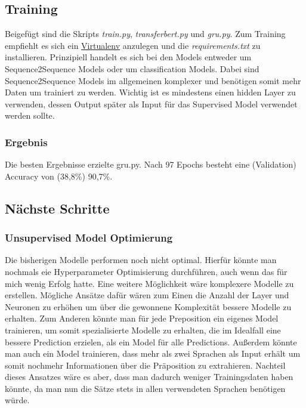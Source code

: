 \documentclass[10pt,a4paper]{article}
\begin{document}
\subsection{Training}
\begin{flushleft}
Beigefügt sind die Skripts \emph{train.py}, \emph{transferbert.py} und \emph{gru.py}. Zum Training empfiehlt es sich ein \href{https://docs.python.org/3/tutorial/venv.html}{Virtualenv} anzulegen und die \emph{requirements.txt} zu installieren.
Prinzipiell handelt es sich bei den Models entweder um Sequence2Sequence Models oder um classification Models. Dabei sind Sequence2Sequence Models im allgemeinen komplexer und benötigen somit mehr Daten um trainiert zu werden. Wichtig ist es mindestens einen hidden Layer zu verwenden, dessen Output später als Input für das Supervised Model verwendet werden sollte.
\end{flushleft}

\subsubsection{Ergebnis}
\begin{flushleft}
Die besten Ergebnisse erzielte gru.py. \newline
Nach 97 Epochs besteht eine (Validation) Accuracy von (38,8\%) 90,7\%.
\end{flushleft}

\subsection{Nächste Schritte}
\subsubsection{Unsupervised Model Optimierung}
\begin{flushleft}
Die bisherigen Modelle performen noch nicht optimal. Hierfür könnte man nochmals eie Hyperparameter Optimisierung durchführen, auch wenn das für mich wenig Erfolg hatte. 
Eine weitere Möglichkeit wäre komplexere Modelle zu erstellen.
Mögliche Ansätze dafür wären zum Einen die Anzahl der Layer und Neuronen zu erhöhen um über die gewonnene Komplexität bessere Modelle zu erhalten. Zum Anderen könnte man für jede Preposition ein eigenes Model trainieren, um somit spezialisierte Modelle zu erhalten, die im Idealfall eine bessere Prediction erzielen, als ein Model für alle Predictions. Außerdem könnte man auch ein Model trainieren, dass mehr als zwei Sprachen als Input erhält um somit nochmehr Informationen über die Präposition zu extrahieren. Nachteil dieses Ansatzes wäre es aber, dass man dadurch weniger Trainingsdaten haben könnte, da man nun die Sätze stets in allen verwendeten Sprachen benötigen würde.
\end{flushleft}
\end{document}
